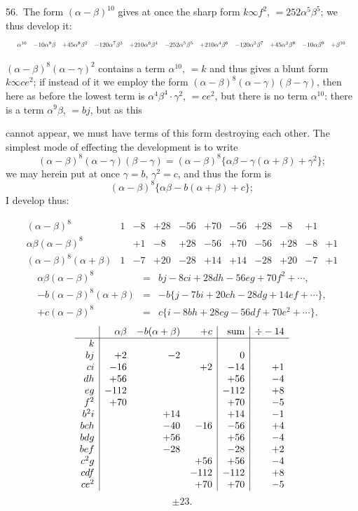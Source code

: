 \documentclass[11pt]{article}
\begin{document}
56.\ The form $(\alpha - \beta)^{10}$ gives at once the sharp form $k \infty f^2$, $= 252\alpha^5\beta^5$; we thus develop it:
\[
\resizebox{\textwidth}{!}{$\displaystyle
\begin{array}{cccccccccccc}
\alpha^{10} & -10\alpha^9\beta & +45\alpha^8\beta^2 & -120\alpha^7\beta^3 & +210\alpha^6\beta^4 & -252\alpha^5\beta^5 & +210\alpha^4\beta^6 & -120\alpha^3\beta^7 & +45\alpha^2\beta^8 & -10\alpha\beta^9 & +\beta^{10}.
\end{array}
$}
\]

$(\alpha - \beta)^8 (\alpha - \gamma)^2$ contains a term $\alpha^{10}$, $= k$ and thus gives a blunt form $k \infty ce^2$; if instead of it we employ the form $(\alpha - \beta)^8 (\alpha - \gamma)(\beta - \gamma)$, then here as before the lowest term is $\alpha^4\beta^4 \cdot \gamma^2$, $= ce^2$, but there is no term $\alpha^{10}$: there is a term $\alpha^9\beta$, $= bj$, but as this

cannot appear, we must have terms of this form destroying each other. The simplest mode of effecting the development is to write
\[
(\alpha - \beta)^8 (\alpha - \gamma)(\beta - \gamma) = (\alpha - \beta)^8 \{\alpha\beta - \gamma(\alpha + \beta) + \gamma^2\};
\]
we may herein put at once $\gamma = b$, $\gamma^2 = c$, and thus the form is
\[
(\alpha - \beta)^8 \{\alpha\beta - b(\alpha + \beta) + c\};
\]
I develop thus:

\[
\begin{array}{lrrrrrrrrrr}
(\alpha-\beta)^8&
1&-8&+28&-56&+70&-56&+28&-8&+1&\\
\alpha\beta(\alpha-\beta)^8&
&+1&-8&+28&-56&+70&-56&+28&-8&+1\\ \hline
(\alpha-\beta)^8(\alpha+\beta)&
1&-7&+20&-28&+14&+14&-28&+20&-7&+1
\end{array}
\]
\[
\begin{array}{rcl}
\alpha\beta(\alpha-\beta)^8&=&bj-8ci+28dh-56eg+70f^2+\cdots,\\
-b(\alpha-\beta)^8(\alpha+\beta)&=&-b\{j-7bi+20ch-28dg+14ef+\cdots\},\\
+c(\alpha-\beta)^8&=&c\{i-8bh+28cg-56df+70e^2+\cdots\}.
\end{array}
\]
\[
\begin{array}{r|rrr|r|r}
 &\alpha\beta&-b(\alpha+\beta)&+c&\hbox{sum}&\div -14\\ \hline
k& & & & &\\
bj&+2&-2&&0&\\
ci&-16&&+2&-14&+1\\
dh&+56&&&+56&-4\\
eg&-112&&&-112&+8\\
f^2&+70&&&+70&-5\\
b^2i&&+14&&+14&-1\\
bch&&-40&-16&-56&+4\\
bdg&&+56&&+56&-4\\
bef&&-28&&-28&+2\\
c^2g&&&+56&+56&-4\\
cdf&&&-112&-112&+8\\
ce^2&&&+70&+70&-5
\end{array}
\]
\[
\pm 23.
\]
\end{document}
